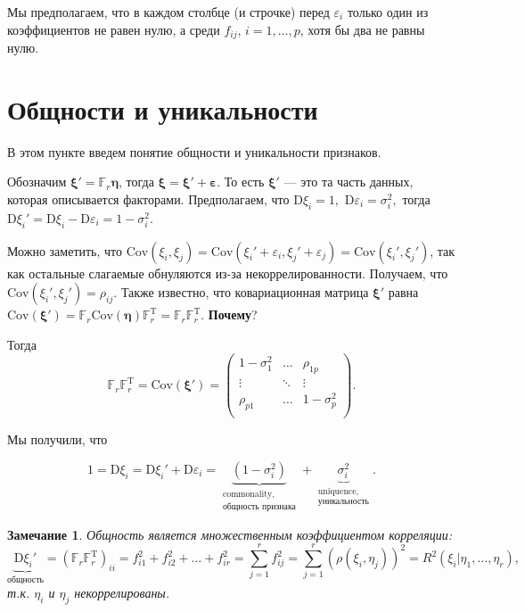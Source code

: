 \documentclass[specialist, 12pt,
subf, %
href, colorlinks=true,
substylefile = spbu.rtx,
]{disser}
\newtheorem{remark}{Замечание}
\begin{document}
Мы предполагаем, что в каждом столбце (и строчке) перед $\varepsilon_i$ только один из коэффициентов не равен нулю, а среди $f_{ij}$, $i=1,\ldots,p$, хотя бы два не равны нулю.

\section{Общности и уникальности}

В этом пункте введем понятие общности и уникальности признаков.

Обозначим $\bm\xi'= \mathbb{F}_r \bm\eta$, тогда $\bm\xi = \bm\xi'+\bm\varepsilon$. То есть $\bm\xi'$ --- это та часть данных, которая описывается факторами. Предполагаем, что $\mathrm{D}\xi_i=1,$ $\mathrm{D}\varepsilon_i=\sigma_i^2,$ тогда $\mathrm{D}\xi_i'=\mathrm{D}\xi_i-\mathrm{D}\varepsilon_i= 1-\sigma_i^2.$

Можно заметить, что $\text{Cov}(\xi_i, \xi_j)=\text{Cov}(\xi_i'+\varepsilon_i, \xi_j'+\varepsilon_j) = \text{Cov}(\xi_i', \xi_j')$, так как остальные слагаемые обнуляются из-за некоррелированности. Получаем, что $\text{Cov}(\xi_i', \xi_j')=\rho_{ij}$. Также известно, что ковариационная матрица $\bm\xi'$ равна $\text{Cov} (\bm\xi') = \mathbb{F}_r \text{Cov}(\bm\eta) \mathbb{F}_r^\mathrm{T} = \mathbb{F}_r\mathbb{F}_r^\mathrm{T}.$ \textbf{Почему}?

Тогда
\begin{equation*}
\mathbb{F}_r\mathbb{F}_r^\mathrm{T} = \text{Cov} (\bm\xi') =
\left(\begin{matrix}
1-\sigma_1^2 & \ldots & \rho_{1p} \\
\vdots & \ddots & \vdots \\
\rho_{p1} & \ldots & 1-\sigma_p^2 \\
\end{matrix}  \right).
\end{equation*}

Мы получили, что

\begin{equation*}
1 = \mathrm{D}\xi_i = \mathrm{D}\xi_i'+\mathrm{D}\varepsilon_i = \underbrace{(1-\sigma_i^2)}_{\substack{\text{commonality}, \\  \text{общность признака}}} + \underbrace{\sigma_i^2}_{\substack{\text{uniquence}, \\  \text{уникальность}}}.
\end{equation*}


\begin{remark}
 Общность является множественным коэффициентом корреляции:
 \begin{equation*}
\underbrace{\mathrm{D}\xi_i'}_{\text{общность}} = (\mathbb{F}_r\mathbb{F}_r^\mathrm{T})_{ii} = f_{i1}^2+f_{i2}^2+\ldots+f_{ir}^2 = \sum\limits_{j=1}^r f_{ij}^2 = \sum \limits_{j=1}^r (\rho(\xi_i,\eta_j))^2 = R^2(\xi_i | \eta_1,\ldots, \eta_r),
 \end{equation*}
 т.к. $\eta_i$ и $\eta_j$ некоррелированы.
\end{remark}
\end{document}
